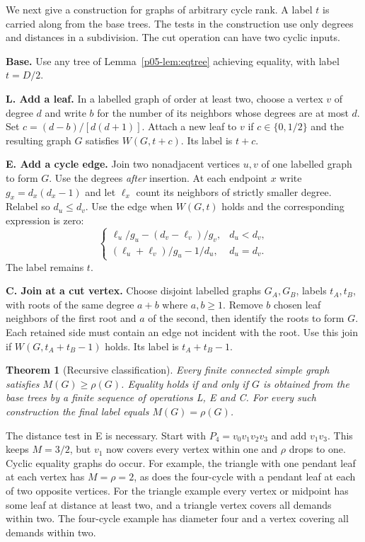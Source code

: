 \documentclass[11pt,a4paper]{article}
\newtheorem{theorem}{Theorem}[section]
\begin{document}
We next give a construction for graphs of arbitrary cycle rank. A label
$t$ is carried along from the base trees. The tests in the construction
use only degrees and distances in a subdivision. The cut operation can
have two cyclic inputs.

\smallskip
\noindent\textbf{Base.} Use any tree of Lemma~\ref{p05-lem:eqtree} achieving
equality, with label $t=D/2$.

\smallskip
\noindent\textbf{L. Add a leaf.} In a labelled graph of order at least two,
choose a vertex $v$ of degree $d$ and write $b$ for the number of its
neighbors whose degrees are at most $d$. Set
$c=(d-b)/[d(d+1)]$. Attach a new leaf to $v$ if
$c\in\{0,1/2\}$ and the resulting graph $G$ satisfies $W(G,t+c)$.
Its label is $t+c$.

\smallskip
\noindent\textbf{E. Add a cycle edge.} Join two nonadjacent vertices $u,v$
of one labelled graph to form $G$. Use the degrees \emph{after} insertion.
At each endpoint $x$ write $g_x=d_x(d_x-1)$ and let $\ell_x$ count its
neighbors of strictly smaller degree. Relabel so $d_u\le d_v$.
Use the edge when $W(G,t)$ holds and the corresponding expression is zero:
\[
 \begin{cases}
 \ell_u/g_u-(d_v-\ell_v)/g_v, & d_u<d_v,\\
 (\ell_u+\ell_v)/g_u-1/d_u, & d_u=d_v .
 \end{cases}
\]
The label remains $t$.

\smallskip
\noindent\textbf{C. Join at a cut vertex.} Choose disjoint labelled graphs
$G_A,G_B$, labels $t_A,t_B$, with roots of the same degree $a+b$ where
$a,b\ge1$. Remove $b$ chosen leaf neighbors of the first root and $a$
of the second, then identify the roots to form $G$. Each retained side
must contain an edge not incident with the root. Use this join if
$W(G,t_A+t_B-1)$ holds. Its label is $t_A+t_B-1$.

\begin{theorem}[Recursive classification]\label{p05-thm:absolute}
Every finite connected simple graph satisfies $M(G)\ge\rho(G)$.
Equality holds if and only if $G$ is obtained from the base trees by a
finite sequence of operations L, E and C. For every such construction the
final label equals $M(G)=\rho(G)$.
\end{theorem}
The distance test in E is necessary. Start with $P_4=v_0v_1v_2v_3$
and add $v_1v_3$. This keeps $M=3/2$, but $v_1$ now covers every
vertex within one and $\rho$ drops to one.
Cyclic equality graphs do occur. For example, the triangle with one
pendant leaf at each vertex has $M=\rho=2$, as does the four-cycle with
a pendant leaf at each of two opposite vertices. For the triangle
example every vertex or midpoint has some leaf at distance at least two,
and a triangle vertex covers all demands within two. The four-cycle
example has diameter four and a vertex covering all demands within two.
\end{document}
